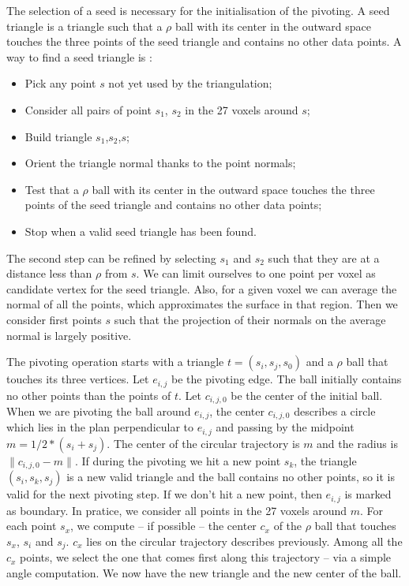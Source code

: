 \documentclass[a4paper]{article}
\begin{document}
The selection of a seed is necessary for the initialisation of the pivoting. A seed triangle is a triangle such that a $\rho$ ball with its center in the outward space touches the three points of the seed triangle and contains no other data points. A way to find a seed triangle is :
\begin{itemize}
\item Pick any point $s$ not yet used by the triangulation;
\item Consider all pairs of point $s_1$, $s_2$ in the 27 voxels around $s$;
\item Build triangle $s_1$,$s_2$,$s$;
\item Orient the triangle normal thanks to the point normals;
\item Test that a $\rho$ ball with its center in the outward space touches the three points of the seed triangle and contains no other data points;
\item Stop when a valid seed triangle has been found.
\end{itemize}

The second step can be refined by selecting $s_1$ and $s_2$ such that they are at a distance less than $\rho$ from $s$. We can limit ourselves to one point per voxel as candidate vertex for the seed triangle. Also, for a given voxel we can average the normal of all the points, which approximates the surface in that region. Then we consider first points $s$ such that the projection of their normals on the average normal is largely positive.

The pivoting operation starts with a triangle $t =(s_i, s_j, s_0)$ and a $\rho$ ball that touches its three vertices. Let $e_{i,j}$ be the pivoting edge. The ball initially contains no other points than the points of $t$. Let $c_{i,j,0}$ be the center of the initial ball. When we are pivoting the ball around $e_{i,j}$, the center $c_{i,j,0}$ describes a circle which lies in the plan perpendicular to $e_{i,j}$ and passing by the midpoint $m = 1/2 * (s_i + s_j)$. The center of the circular trajectory is $m$ and the radius is $\| c_{i,j,0} - m \|$. If during the pivoting we hit a new point $s_k$, the triangle $(s_i, s_k, s_j)$ is a new valid triangle and the ball contains no other points, so it is valid for the next pivoting step. If we don't hit a new point, then $e_{i,j}$ is marked as boundary.
In pratice, we consider all points in the 27 voxels around $m$. For each point $s_x$, we compute -- if possible -- the center $c_x$ of the $\rho$ ball that touches $s_x$, $s_i$ and $s_j$. $c_x$ lies on the circular trajectory describes previously. Among all the $c_x$ points, we select the one that comes first along this trajectory -- via a simple angle computation. We now have the new triangle and the new center of the ball.
\end{document}

